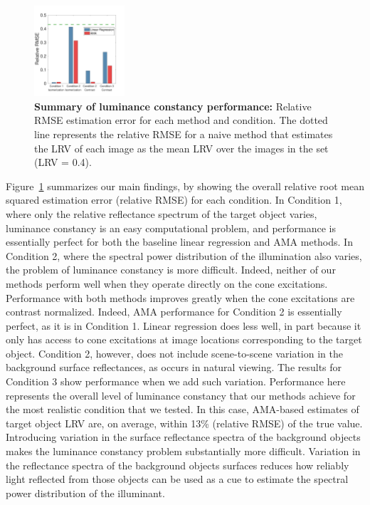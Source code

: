 \documentclass{jov}
\providecommand{\DIFdeltex}[1]{} %
\providecommand{\DIFdelFL}[1]{\DIFdel{#1}} %
\providecommand{\DIFdelbeginFL}{} %
\providecommand{\DIFdelendFL}{} %
\providecommand{\DIFdel}[1]{\texorpdfstring{\DIFdeltex{#1}}{}} %
\newcommand{\DIFscaledelfig}{0.5}
\newlength{\DIFdelgraphicswidth} %
\newlength{\DIFdelgraphicsheight} %
\newcommand{\DIFdelincludegraphics}[2][]{%
\sbox{\DIFdelgraphicsbox}{\DIFOincludegraphics[#1]{#2}}%
\settoboxwidth{\DIFdelgraphicswidth}{\DIFdelgraphicsbox} %
\settoboxtotalheight{\DIFdelgraphicsheight}{\DIFdelgraphicsbox} %
\scalebox{\DIFscaledelfig}{%
\parbox[b]{\DIFdelgraphicswidth}{\usebox{\DIFdelgraphicsbox}\\[-\baselineskip] \rule{\DIFdelgraphicswidth}{0em}}\llap{\resizebox{\DIFdelgraphicswidth}{\DIFdelgraphicsheight}{%
\setlength{\unitlength}{\DIFdelgraphicswidth}%
\begin{picture}(1,1)%
\thicklines\linethickness{2pt} %
{\color[rgb]{1,0,0}\put(0,0){\framebox(1,1){}}}%
{\color[rgb]{1,0,0}\put(0,0){\line( 1,1){1}}}%
{\color[rgb]{1,0,0}\put(0,1){\line(1,-1){1}}}%
\end{picture}%
}\hspace*{3pt}}} %
} %
\DeclareRobustCommand{\DIFdelbeginFL}{\DIFOdelbeginFL \let\includegraphics\DIFdelincludegraphics} %
\DeclareRobustCommand{\DIFdelendFL}{\DIFOaddendFL \let\includegraphics\DIFOincludegraphics} %
\begin{document}
\begin{figure}
\centering
\includegraphics[width=0.3\textwidth]{../FiguresDraft5/Figure14/Figure14.pdf}
\caption{{\bf Summary of luminance constancy performance:} Relative RMSE estimation error for each method and condition. \DIFdelbeginFL \DIFdelFL{Relative RMSE is the square root of the mean of the squared difference between the estimated and true LRV divided by the true LRV. }\DIFdelendFL The \DIFdelbeginFL \DIFdelFL{mean is taken over all stimuli in the test set. The }\DIFdelendFL dotted line represents the relative RMSE for a naive method that estimates the LRV of each image as the mean LRV over the images in the set (LRV = 0.4).}
 \label{fig:barGraphs}
\end{figure}

Figure~\ref{fig:barGraphs} summarizes our main findings, by showing the overall relative root mean squared estimation error (relative RMSE) for each condition. 
In Condition 1, where only the relative reflectance spectrum of the target object varies, 
luminance constancy is an easy computational problem,
and performance is essentially perfect for both the baseline linear regression and AMA methods.
In Condition 2, where the spectral power distribution of the illumination also varies, the problem of luminance constancy is more difficult.
Indeed, neither of our methods perform well when they operate directly on the cone excitations.
Performance with both methods improves greatly when the cone excitations are contrast normalized. 
Indeed, AMA performance for Condition 2 is essentially perfect, as it is in Condition 1.
Linear regression does less well, in part because it only has access to cone excitations at image locations
corresponding to the target object.
Condition 2, however, does not include scene-to-scene variation in the background surface reflectances,
as occurs in natural viewing.
The results for Condition 3 show performance when we add such variation.
Performance here represents the overall level of luminance constancy that our methods achieve for the
most realistic condition that we tested.
In this case, AMA-based estimates of target object LRV are, on average, within 13\% (relative RMSE) of the true value.
Introducing variation in the surface reflectance spectra of the background objects makes 
the luminance constancy problem substantially more difficult. 
Variation in the reflectance spectra of the background objects surfaces reduces how 
reliably light reflected from those objects can be used as a cue to estimate the spectral power distribution of the illuminant.
\end{document}
